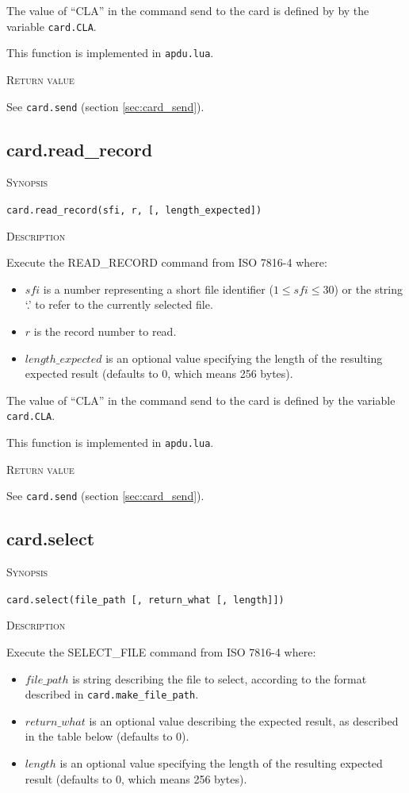 \documentclass[11pt]{report}
\newcommand{\mansection}[1]{\vspace{0.5em}\par\noindent\textsc{#1}\vspace{0.5em}\par}
\begin{document}
  The value of ``CLA'' in the command send to the card is defined by by the variable \texttt{card.CLA}.

  This function is implemented in \texttt{apdu.lua}.

\mansection{Return value}
  See \texttt{card.send} (section \ref{sec:card_send}).


\subsection{card.read\_record}

\mansection{Synopsis}
\texttt{card.read\_record(sfi, r, [, length\_expected])}


\mansection{Description}
  Execute the READ\_RECORD command from ISO 7816-4 where:
  \begin{itemize}
  \item{$sfi$ is a number representing a short file identifier ($1\le sfi \le 30$) or the string `.' to refer to the currently selected file.}
  \item{$r$ is the record number to read.}
  \item{$length\_expected$ is an optional value specifying the length of the resulting expected result (defaults to 0, which means 256 bytes).}
  \end{itemize}

  The value of ``CLA'' in the command send to the card is defined by the variable \texttt{card.CLA}.

  This function is implemented in \texttt{apdu.lua}.

\mansection{Return value}
  See \texttt{card.send} (section \ref{sec:card_send}).


\subsection{card.select}

\mansection{Synopsis}
\texttt{card.select(file\_path [, return\_what [, length]])}

\mansection{Description}
  Execute the SELECT\_FILE command from ISO 7816-4 where:
  \begin{itemize}
  \item{$file\_path$ is string describing the file to select, according to the format described in \texttt{card.make\_file\_path}.}
  \item{$return\_what$ is an optional value describing the expected result, as described in the table below (defaults to 0).}
  \item{$length$ is an optional value specifying the length of the resulting expected result (defaults to 0, which means 256 bytes).}
  \end{itemize}
\end{document}

